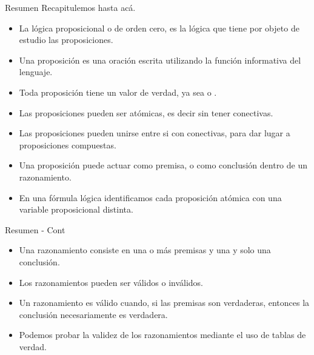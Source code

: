 \begin{frame}{Resumen}
  Recapitulemos hasta acá.
  \jump
  \begin{itemize}
    \item La lógica proposicional o de orden cero, es la lógica que tiene por objeto de
      estudio las proposiciones.
    \item Una proposición es una oración escrita utilizando la función informativa del lenguaje.
    \item Toda proposición tiene un valor de verdad, ya sea \fulltrue o \fullfalse.
    \item Las proposiciones pueden ser atómicas, es decir sin tener conectivas.
    \item Las proposiciones pueden unirse entre si con conectivas, para dar lugar a
      proposiciones compuestas.
    \item Una proposición puede actuar como premisa, o como conclusión dentro
      de un razonamiento.
    \item En una fórmula lógica identificamos cada proposición atómica con una
      variable proposicional distinta.
  \end{itemize}
\end{frame}


\begin{frame}{Resumen - Cont}
  \begin{itemize}
    \item Una razonamiento consiste en una o más premisas y una y solo una
      conclusión.
    \item Los razonamientos pueden ser válidos o inválidos.
    \item Un razonamiento es válido cuando, si las premisas son verdaderas,
      entonces la conclusión necesariamente es verdadera.
    \item Podemos probar la validez de los razonamientos mediante el uso de
      tablas de verdad.
  \end{itemize}
\end{frame}


